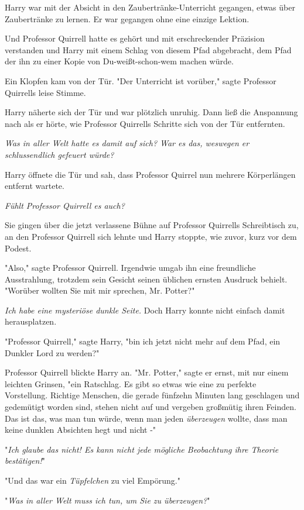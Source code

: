 {Harry war mit der Absicht in den Zaubertränke-Unterricht gegangen, etwas über Zaubertränke zu lernen. Er war gegangen ohne eine einzige Lektion.

Und Professor Quirrell hatte es gehört und mit erschreckender Präzision verstanden und Harry mit einem Schlag von diesem Pfad abgebracht, dem Pfad der ihn zu einer Kopie von Du-weißt-schon-wem machen würde.

Ein Klopfen kam von der Tür. "Der Unterricht ist vorüber," sagte Professor Quirrells leise Stimme.

Harry näherte sich der Tür und war plötzlich unruhig. Dann ließ die Anspannung nach als er hörte, wie Professor Quirrells Schritte sich von der Tür entfernten.

\emph{Was in aller Welt hatte es damit auf sich? War es das, weswegen er schlussendlich gefeuert würde?}

Harry öffnete die Tür und sah, dass Professor Quirrel nun mehrere Körperlängen entfernt wartete.

\emph{Fühlt Professor Quirrell es auch?}

Sie gingen über die jetzt verlassene Bühne auf Professor Quirrells Schreibtisch zu, an den Professor Quirrell sich lehnte und Harry stoppte, wie zuvor, kurz vor dem Podest.

"Also," sagte Professor Quirrell. Irgendwie umgab ihn eine freundliche Ausstrahlung, trotzdem sein Gesicht seinen üblichen ernsten Ausdruck behielt. "Worüber wollten Sie mit mir sprechen, Mr. Potter?"

\emph{Ich habe eine mysteriöse dunkle Seite.} Doch Harry konnte nicht einfach damit herausplatzen.

"Professor Quirrell," sagte Harry, "bin ich jetzt nicht mehr auf dem Pfad, ein Dunkler Lord zu werden?"

Professor Quirrell blickte Harry an. "Mr. Potter," sagte er ernst, mit nur einem leichten Grinsen, "ein Ratschlag. Es gibt so etwas wie eine zu perfekte Vorstellung. Richtige Menschen, die gerade fünfzehn Minuten lang geschlagen und gedemütigt worden sind, stehen nicht auf und vergeben großmütig ihren Feinden. Das ist das, was man tun würde, wenn man jeden \emph{überzeugen} wollte, dass man keine dunklen Absichten hegt und nicht -"

"\emph{Ich glaube das nicht! Es kann nicht jede mögliche Beobachtung ihre Theorie bestätigen!}"

"Und das war ein \emph{Tüpfelchen} zu viel Empörung."

"\emph{Was in aller Welt muss ich tun, um Sie zu überzeugen?}"

}
